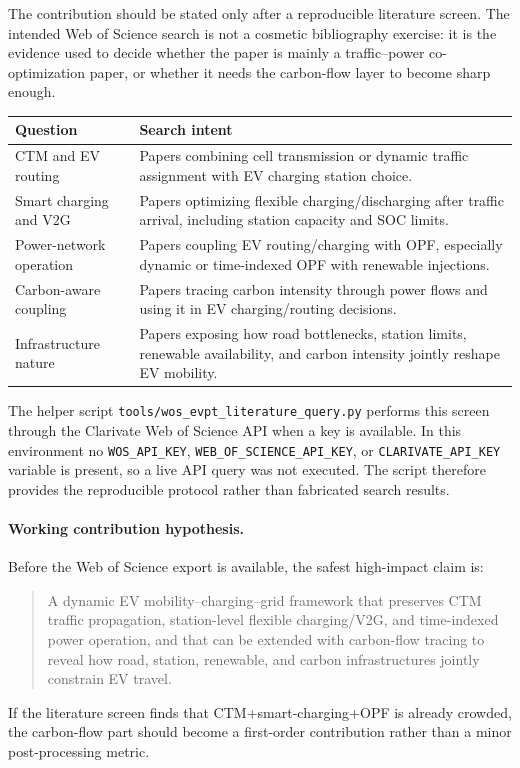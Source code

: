 The contribution should be stated only after a reproducible literature screen.
The intended Web of Science search is not a cosmetic bibliography exercise: it
is the evidence used to decide whether the paper is mainly a traffic--power
co-optimization paper, or whether it needs the carbon-flow layer to become
sharp enough.

\begin{center}
\begin{tabularx}{\textwidth}{L{0.22\textwidth}X}
\toprule
\textbf{Question} & \textbf{Search intent} \\
\midrule
CTM and EV routing & Papers combining cell transmission or dynamic traffic
assignment with EV charging station choice. \\
Smart charging and V2G & Papers optimizing flexible charging/discharging after
traffic arrival, including station capacity and SOC limits. \\
Power-network operation & Papers coupling EV routing/charging with OPF,
especially dynamic or time-indexed OPF with renewable injections. \\
Carbon-aware coupling & Papers tracing carbon intensity through power flows and
using it in EV charging/routing decisions. \\
Infrastructure nature & Papers exposing how road bottlenecks, station limits,
renewable availability, and carbon intensity jointly reshape EV mobility. \\
\bottomrule
\end{tabularx}
\end{center}

The helper script \texttt{tools/wos\_evpt\_literature\_query.py} performs this
screen through the Clarivate Web of Science API when a key is available. In
this environment no \texttt{WOS\_API\_KEY},
\texttt{WEB\_OF\_SCIENCE\_API\_KEY}, or \texttt{CLARIVATE\_API\_KEY} variable
is present, so a live API query was not executed. The script therefore provides
the reproducible protocol rather than fabricated search results.

\paragraph{Working contribution hypothesis.}
Before the Web of Science export is available, the safest high-impact claim is:
\begin{quote}
  A dynamic EV mobility--charging--grid framework that preserves CTM traffic
  propagation, station-level flexible charging/V2G, and time-indexed power
  operation, and that can be extended with carbon-flow tracing to reveal how
  road, station, renewable, and carbon infrastructures jointly constrain EV
  travel.
\end{quote}
If the literature screen finds that CTM+smart-charging+OPF is already crowded,
the carbon-flow part should become a first-order contribution rather than a
minor post-processing metric.

